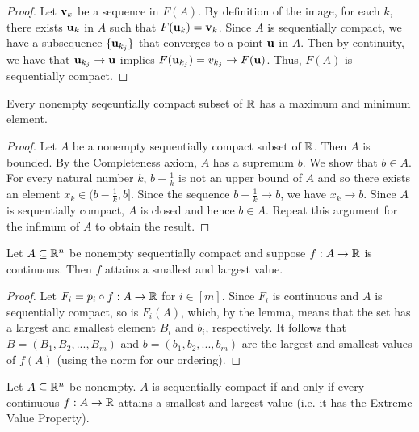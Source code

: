 \documentclass[letterpaper, twoside, 12pt]{book}
\begin{document}
\begin{proof}
    Let \(\mathbf v_k\) be a sequence in \(F(A)\). By definition of 
    the image, for each \(k\), there exists \(\mathbf u_k\) in \(A\)
    such that \(F(\mathbf u_k) = \mathbf v_k\). Since \(A\) is sequentially
    compact, we have a subsequence \(\{\mathbf u_{k_j}\}\) that converges
    to a point \(\mathbf u\) in \(A\). Then by continuity, we have
    that \(\mathbf u_{k_j} \to \mathbf u\) implies 
    \(F(\mathbf u_{k_j}) = v_{k_j} \to F(\mathbf u)\). Thus, \(F(A)\) is 
    sequentially compact.
\end{proof}

\begin{lemma}[11.21]
  Every nonempty seqeuntially compact subset of \(\mathbb R\) has a
  maximum and minimum element.
\end{lemma}

\begin{proof}
    Let \(A\) be a nonempty sequentially compact subset of \(\mathbb R\).
    Then \(A\) is bounded. By the Completeness axiom, \(A\) has a
    supremum \(b\). We show that \(b \in A\). For every natural number
    \(k\), \(b - \frac{1}{k}\) is not an upper bound of \(A\) and so
    there exists an element \(x_k \in (b - \frac{1}{k}, b]\). Since
    the sequence \(b - \frac{1}{k} \to b\), we have \(x_k \to b\).
    Since \(A\) is sequentially compact, \(A\) is closed and hence
    \(b \in A\). Repeat this argument for the infimum of \(A\) to 
    obtain the result.
\end{proof}

\begin{theorem}
  Let \(A\subseteq\mathbb R^n\) be nonempty sequentially compact
  and suppose \(f:A\to\mathbb R\) is continuous.
  Then \(f\) attains a smallest and largest value.
\end{theorem}

\begin{proof}
    Let \(F_i = p_i \circ f: A \rightarrow \mathbb R\) for \(i \in [m]\). 
    Since \(F_i\) is continuous and \(A\) is sequentially compact,
    so is \(F_i(A)\), which, by the lemma, means that the set has
    a largest and smallest element \(B_i\) and \(b_i\), respectively.
    It follows that \(B = (B_1, B_2, ..., B_m)\) and \(b = (b_1, b_2, ..., b_m)\)
    are the largest and smallest values of \(f(A)\) (using the
    norm for our ordering). 
\end{proof}

\begin{theorem}[11.24]
  Let \(A\subseteq\mathbb R^n\) be nonempty.
  \(A\) is sequentially compact if and only if
  every continuous \(f:A\to\mathbb R\) attains a smallest and largest value
  (i.e. it has the Extreme Value Property).
\end{theorem}
\end{document}
